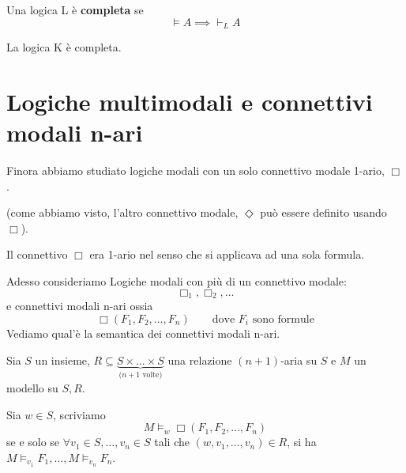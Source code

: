 \documentclass[../main.tex]{subfiles}
\begin{document}
\begin{definition}
    Una logica L è \textbf{completa} se
    \begin{equation*}
        \vDash A \implies \vdash_L A
    \end{equation*}
\end{definition}
\begin{theorem}
    La logica K è completa.
\end{theorem}

\section{Logiche multimodali e connettivi modali n-ari}
Finora abbiamo studiato logiche modali con un solo connettivo modale 1-ario, $\Box$.

(come abbiamo visto, l'altro connettivo modale, $\Diamond$ può essere definito usando $\Box$).

Il connettivo $\Box$ era 1-ario nel senso che si applicava ad una sola formula.

Adesso consideriamo Logiche modali con più di un connettivo modale:
\begin{equation*}
    \Box_1, \Box_2, \ldots
\end{equation*}
e connettivi modali n-ari ossia
\begin{equation*}
    \Box (F_1, F_2, \ldots, F_n) \qquad \text{dove $F_i$ sono formule}
\end{equation*}
Vediamo qual'è la semantica dei connettivi modali n-ari.

Sia $S$ un insieme, $R \subseteq \underbrace{S \times \ldots \times S}_{\text{($n + 1$ volte)}}$ una relazione $(n + 1)$-aria su $S$ e $M$ un modello su $S,R$.

Sia $w \in S$, scriviamo
\begin{equation*}
    M \vDash_w \Box (F_1, F_2, \ldots, F_n)
\end{equation*}
se e solo se $\forall v_1 \in S, \ldots , v_n \in S$ tali che $(w,v_1,\ldots,v_n) \in R$, si ha $M \vDash_{v_1} F_1, \ldots , M \vDash_{v_n} F_n$.
\end{document}
